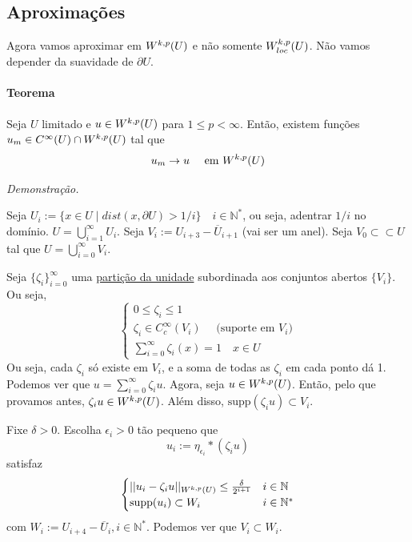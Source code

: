\documentclass[11pt]{article}
\newcommand{\N}{\mathbb{N}}
\newcommand{\e}{\epsilon}
\newcommand{\pu}{\partial U}
\begin{document}
\subsection{Aproximações}

Agora vamos aproximar em \( W^{k,p}(U) \) e não somente \( W^{k,p}_{loc}(U)\). Não vamos depender da suavidade de \( \pu \).

\paragraph{Teorema} Seja \( U \) limitado e \( u \in W^{k,p}(U) \) para \( 1\leq p < \infty \). Então, existem funções \( u_m \in C^{\infty}(U) \cap W^{k,p}(U) \) tal que \[ u_m \rightarrow u \quad \text{ em }W^{k,p}(U) \]

\textit{Demonstração.}

Seja \( U_i := \{ x \in U \mid dist(x, \pu) > 1/i\} \quad i \in \N^*\), ou seja, adentrar \( 1/i \) no domínio. \( U = \bigcup_{i=1}^\infty U_i \). Seja \( V_i := U_{i+3} - \overline{U}_{i+1} \) (vai ser um anel). Seja \( V_0 \subset\subset U \) tal que \( U=\bigcup_{i=0}^{\infty}V_i \).

Seja \( \{\zeta_i\}_{i=0}^{\infty} \) uma \href{https://en.wikipedia.org/wiki/Partition_of_unity}{partição da unidade} subordinada aos conjuntos abertos \( \{V_i\} \). Ou seja, \[ \begin{cases}
	0 \leq \zeta_i \leq 1 \\
	\zeta_i \in C^\infty_c(V_i)\quad  \text{ (suporte em } V_i \text{)}\\
	\sum_{i=0}^{\infty} \zeta_i(x) = 1 \quad x \in U
\end{cases} \] Ou seja, cada \( \zeta_i \) só existe em \( V_i \), e a soma de todas as \( \zeta_i \) em cada ponto dá 1. Podemos ver que \( u=\sum_{i=0}^{\infty}\zeta_iu \). Agora, seja \( u \in W^{k,p}(U) \). Então, pelo que provamos antes, \( \zeta_iu \in W^{k,p}(U) \). Além disso, \( \text{supp}(\zeta_i u) \subset V_i \).

Fixe \( \delta>0\). Escolha \( \e_i>0 \) tão pequeno que \[ u_i := \eta_{\e_i} * \left(\zeta_iu\right) \] satisfaz \[ \begin{cases}
	||u_i - \zeta_iu||_{\sobolevdef} \leq \frac{\delta}{2^{i+1}} & i \in \N \\
	\text{supp}(u_i) \subset W_i & i \in \N^*
\end{cases} \] com \( W_i := U_{i+4} - \overline{U}_i, i \in \N^* \). Podemos ver que \( V_i \subset W_i \). 
\end{document}
